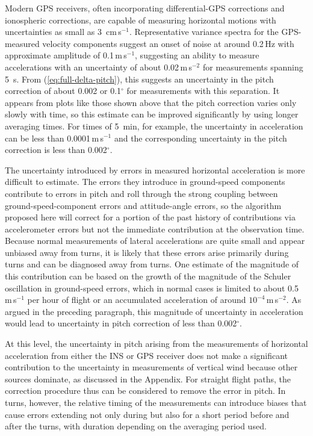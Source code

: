 \documentclass[english,british,amtd,bookmarks=false,unicode=true]{copernicus}\usepackage[]{graphicx}\usepackage[]{color}
\begin{document}
Modern GPS receivers, often incorporating differential-GPS corrections
and ionospheric corrections, are capable of measuring horizontal motions
with uncertainties as small as 3~cm\,s$^{-1}$. Representative variance
spectra for the GPS-measured velocity components suggest an onset
of noise at around 0.2\,Hz with approximate amplitude of 0.1\,m\,s$^{-1}$,
suggesting an ability to measure accelerations with an uncertainty
of about 0.02\,m\,s$^{-2}$ for measurements spanning 5~s. From
(\ref{eq:full-delta-pitch}), this suggests an uncertainty in the
pitch correction of about 0.002 or 0.1$^{\circ}$ for measurements
with this separation. It appears from plots like those shown above
that the pitch correction varies only slowly with time, so this estimate
can be improved significantly by using longer averaging times. For
times of 5~min, for example, the uncertainty in acceleration can
be less than 0.0001\,m\,s$^{-1}$ and the corresponding uncertainty
in the pitch correction is less than 0.002$^{\circ}$. 

The uncertainty introduced by errors in measured horizontal acceleration
is more difficult to estimate. The errors they introduce in ground-speed
components contribute to errors in pitch and roll through the strong
coupling between ground-speed-component errors and attitude-angle
errors, so the algorithm proposed here will correct for a portion
of the past history of contributions via accelerometer errors but
not the immediate contribution at the observation time. Because normal
measurements of lateral accelerations are quite small and appear unbiased
away from turns, it is likely that these errors arise primarily during
turns and can be diagnosed away from turns. One estimate of the magnitude
of this contribution can be based on the growth of the magnitude of
the Schuler oscillation in ground-speed errors, which in normal cases
is limited to about 0.5\,m\,s$^{-1}$ per hour of flight or an accumulated
acceleration of around $10^{-4}$\,m\,s$^{-2}$. As argued in the
preceding paragraph, this magnitude of uncertainty in acceleration
would lead to uncertainty in pitch correction of less than 0.002$^{\circ}.$

At this level, the uncertainty in pitch arising from the measurements
of horizontal acceleration from either the INS or GPS receiver does
not make a significant contribution to the uncertainty in measurements
of vertical wind because other sources dominate, as discussed in the
Appendix. For straight flight paths, the correction procedure thus
can be considered to remove the error in pitch. In turns, however,
the relative timing of the measurements can introduce biases that
cause errors extending not only during but also for a short period
before and after the turns, with duration depending on the averaging
period used.
\end{document}

